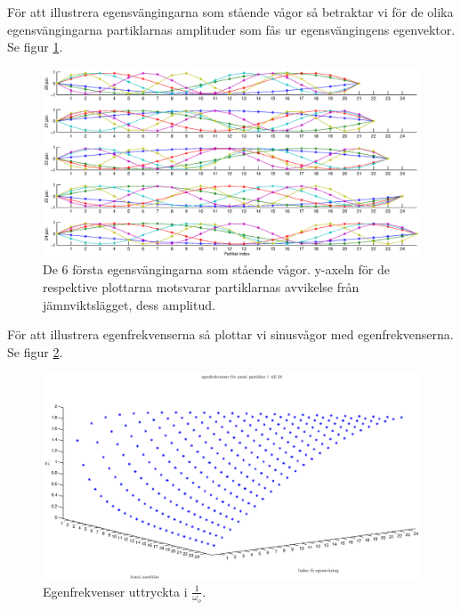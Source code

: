 \documentclass[12pt,a4paper]{article}
\newcommand{\captiona}[1]{\caption{\scriptsize{#1}}}
\begin{document}
		För att illustrera egensvängingarna som stående vågor så betraktar vi för de olika
		egensvängingarna partiklarnas amplituder som fås ur egensvängingens egenvektor. Se figur \ref{stavag}.
		
		\begin{figure}[h]
			\includegraphics[width=1\textwidth]{staendevagor.eps}
			\vspace{-36pt}
			\captiona{De 6 första egensvängingarna som stående vågor. y-axeln
			för de respektive plottarna motsvarar partiklarnas avvikelse från jämnviktslägget,
			dess amplitud.}
			\label{stavag}
		\end{figure}
		
		För att illustrera egenfrekvenserna så plottar vi sinusvågor med egenfrekvenserna. Se figur \ref{egenf}.
		
		
		\begin{figure}[h]
			\includegraphics[width=1\textwidth]{egenfrekvenser.eps}
			\vspace{-28pt}
			\captiona{Egenfrekvenser uttryckta i $\frac{1}{\omega_o}$.}
			\label{egenf}
		\end{figure}
	
\end{document}
